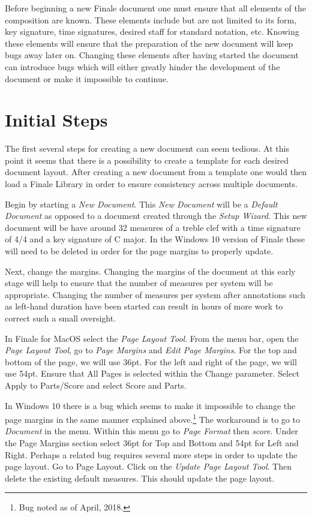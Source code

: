 \documentclass[]{memoir}
\begin{document}
Before beginning a new Finale document one must ensure that all
elements of the composition are known. These elements include but are
not limited to its form, key signature, time signatures, desired staff
for standard notation, etc. Knowing these elements will ensure that
the preparation of the new document will keep bugs away later
on. Changing these elements after having started the document can
introduce bugs which will either greatly hinder the development of the
document or make it impossible to continue.

\section{Initial Steps}
\label{sec:initial-steps}

The first several steps for creating a new document can seem
tedious. At this point it seems that there is a possibility to create
a template for each desired document layout. After creating a new
document from a template one would then load a Finale Library in order
to ensure consistency across multiple documents.

Begin by starting a \emph{New Document}. This \emph{New Document} will
be a \emph{Default Document} as opposed to a document created through
the \emph{Setup Wizard}. This new document will be have around 32
measures of a treble clef with a time signature of 4/4 and a key
signature of C major. In the Windows 10 version of Finale these will
need to be deleted in order for the page margins to properly update.

Next, change the margins. Changing the margins of the document at this
early stage will help to ensure that the number of measures per system
will be appropriate. Changing the number of measures per system after
annotations such as left-hand duration have been started can result in
hours of more work to correct such a small oversight.

In Finale for MacOS select the \emph{Page Layout Tool}. From the menu
bar, open the \emph{Page Layout Tool}, go to \emph{Page Margins} and
\emph{Edit Page Margins}. For the top and bottom of the page, we will
use 36pt. For the left and right of the page, we will use 54pt. Ensure
that All Pages is selected within the Change parameter. Select Apply
to Parts/Score and select Score and Parts.

In Windows 10 there is a bug which seems to make it impossible to
change the page margins in the same manner explained
above.\footnote{Bug noted as of April, 2018.} The workaround is to go
to \emph{Document} in the menu. Within this menu go to \emph{Page
  Format} then \emph{score}. Under the Page Margins section select
36pt for Top and Bottom and 54pt for Left and Right. Perhaps a related
bug requires several more steps in order to update the page layout. Go
to Page Layout. Click on the \emph{Update Page Layout Tool}. Then
delete the existing default measures. This should update the page
layout.
\end{document}
